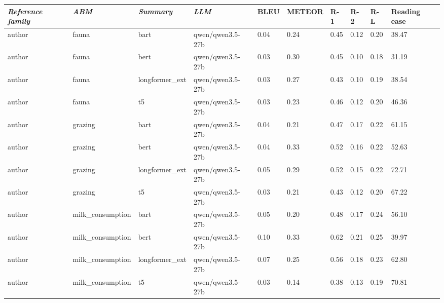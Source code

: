\begin{tabular}{|l|l|l|l|l|l|l|l|l|l|}
\hline
\textit{\textbf{Reference family}} & \textit{\textbf{ABM}} & \textit{\textbf{Summary}} & \textit{\textbf{LLM}} & BLEU & METEOR & R-1 & R-2 & R-L & Reading ease \\
 \hline
 author & fauna & bart & qwen/qwen3.5-27b & 0.04 & 0.24 & 0.45 & 0.12 & 0.20 & 38.47 \\
 \hline
 author & fauna & bert & qwen/qwen3.5-27b & 0.03 & 0.30 & 0.45 & 0.10 & 0.18 & 31.19 \\
 \hline
 author & fauna & longformer\_ext & qwen/qwen3.5-27b & 0.03 & 0.27 & 0.43 & 0.10 & 0.19 & 38.54 \\
 \hline
 author & fauna & t5 & qwen/qwen3.5-27b & 0.03 & 0.23 & 0.46 & 0.12 & 0.20 & 46.36 \\
 \hline
 author & grazing & bart & qwen/qwen3.5-27b & 0.04 & 0.21 & 0.47 & 0.17 & 0.22 & 61.15 \\
 \hline
 author & grazing & bert & qwen/qwen3.5-27b & 0.04 & 0.33 & 0.52 & 0.16 & 0.22 & 52.63 \\
 \hline
 author & grazing & longformer\_ext & qwen/qwen3.5-27b & 0.05 & 0.29 & 0.52 & 0.15 & 0.22 & 72.71 \\
 \hline
 author & grazing & t5 & qwen/qwen3.5-27b & 0.03 & 0.21 & 0.43 & 0.12 & 0.20 & 67.22 \\
 \hline
 author & milk\_consumption & bart & qwen/qwen3.5-27b & 0.05 & 0.20 & 0.48 & 0.17 & 0.24 & 56.10 \\
 \hline
 author & milk\_consumption & bert & qwen/qwen3.5-27b & 0.10 & 0.33 & 0.62 & 0.21 & 0.25 & 39.97 \\
 \hline
 author & milk\_consumption & longformer\_ext & qwen/qwen3.5-27b & 0.07 & 0.25 & 0.56 & 0.18 & 0.23 & 62.80 \\
 \hline
 author & milk\_consumption & t5 & qwen/qwen3.5-27b & 0.03 & 0.14 & 0.38 & 0.13 & 0.19 & 70.81 \\
\hline
\end{tabular}
